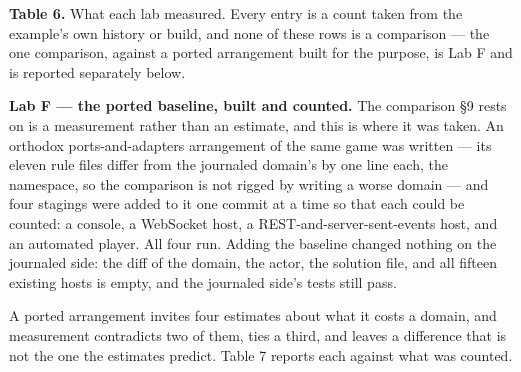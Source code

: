 \documentclass[
]{article}
\newcounter{none} %
\begin{document}
\textbf{Table 6.} What each lab measured. Every entry is a count taken
from the example's own history or build, and none of these rows is a
comparison --- the one comparison, against a ported arrangement built
for the purpose, is Lab F and is reported separately below.

\textbf{Lab F --- the ported baseline, built and counted.} The
comparison §9 rests on is a measurement rather than an estimate, and
this is where it was taken. An orthodox ports-and-adapters arrangement
of the same game was written --- its eleven rule files differ from the
journaled domain's by one line each, the namespace, so the comparison is
not rigged by writing a worse domain --- and four stagings were added to
it one commit at a time so that each could be counted: a console, a
WebSocket host, a REST-and-server-sent-events host, and an automated
player. All four run. Adding the baseline changed nothing on the
journaled side: the diff of the domain, the actor, the solution file,
and all fifteen existing hosts is empty, and the journaled side's tests
still pass.

A ported arrangement invites four estimates about what it costs a
domain, and measurement contradicts two of them, ties a third, and
leaves a difference that is not the one the estimates predict. Table 7
reports each against what was counted.
\end{document}
